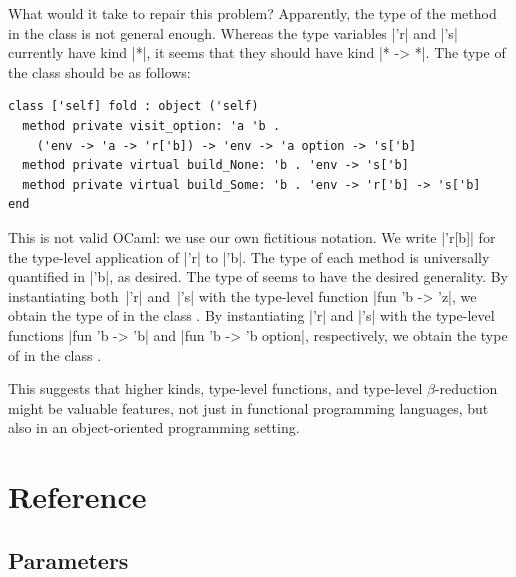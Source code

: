 \documentclass[11pt,a4paper,twoside]{article}
\begin{document}
What would it take to repair this problem? Apparently, the type of the method
 in the class \fold is not general enough. Whereas the
type variables \oc|'r| and \oc|'s| currently have kind \oc|*|, it seems that
they should have kind \oc|* -> *|. The type of the class \fold should be as
follows:
%
\begin{mdframed}[backgroundcolor=green!10]
\begin{lstlisting}
class ['self] fold : object ('self)
  method private visit_option: 'a 'b .
    ('env -> 'a -> 'r['b]) -> 'env -> 'a option -> 's['b]
  method private virtual build_None: 'b . 'env -> 's['b]
  method private virtual build_Some: 'b . 'env -> 'r['b] -> 's['b]
end
\end{lstlisting}
\end{mdframed}

This is not valid OCaml: we use our own fictitious notation.
We write \oc|'r[b]| for the type-level application of
\oc|'r| to \oc|'b|. The type of each method is universally quantified in
\oc|'b|, as desired. The type of  seems to have the
desired generality. By instantiating both~\oc|'r| and~\oc|'s| with the
type-level function \oc|fun 'b -> 'z|, we obtain the type of
 in the class \reduce. By instantiating \oc|'r| and
\oc|'s| with the type-level functions
%
\oc|fun 'b -> 'b| and \oc|fun 'b -> 'b option|,
respectively,
we obtain the
type of  in the class \map.

This suggests that higher kinds, type-level functions, and type-level
$\beta$-reduction might be valuable features, not just in functional
programming languages, but also in an object-oriented programming setting.




\clearpage

\section{Reference}

\subsection{Parameters}
\label{sec:params}
\label{sec:ancestors}
\end{document}
